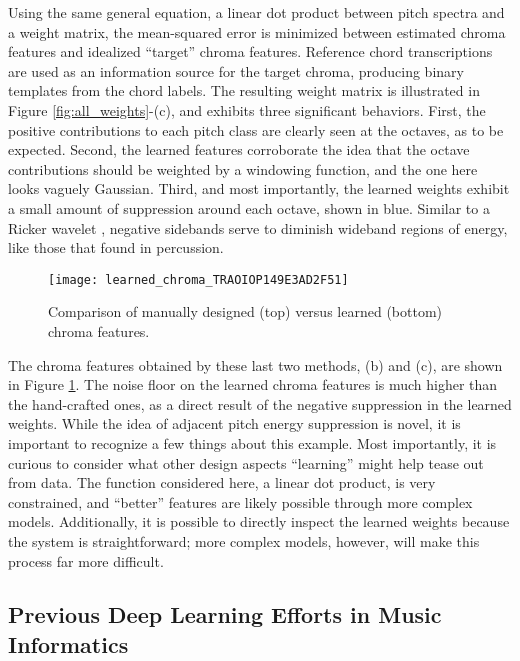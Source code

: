 Using the same general equation, a linear dot product between pitch spectra and a weight matrix, the mean-squared error is minimized between estimated chroma features and idealized ``target'' chroma features.
Reference chord transcriptions are used as an information source for the target chroma, producing binary templates from the chord labels.
The resulting weight matrix is illustrated in Figure \ref{fig:all_weights}-(c), and exhibits three significant behaviors.
First, the positive contributions to each pitch class are clearly seen at the octaves, as to be expected.
Second, the learned features corroborate the idea that the octave contributions should be weighted by a windowing function, and the one here looks vaguely Gaussian.
Third, and most importantly, the learned weights exhibit a small amount of suppression around each octave, shown in blue.
Similar to a Ricker wavelet \cite{Vaidyanathan1993Multirate}, negative sidebands serve to diminish wideband regions of energy, like those that found in percussion.


\begin{figure}
\begin{centering}
\texttt{[image: learned\_chroma\_TRAOIOP149E3AD2F51]}
\caption{Comparison of manually designed (top) versus learned (bottom) chroma features.}
\label{fig:learned_chroma}
\end{centering}
\end{figure}

The chroma features obtained by these last two methods, (b) and (c), are shown in Figure \ref{fig:learned_chroma}.
The noise floor on the learned chroma features is much higher than the hand-crafted ones, as a direct result of the negative suppression in the learned weights.
While the idea of adjacent pitch energy suppression is novel, it is important to recognize a few things about this example.
Most importantly, it is curious to consider what other design aspects ``learning'' might help tease out from data.
The function considered here, a linear dot product, is very constrained, and ``better'' features are likely possible through more complex models.
Additionally, it is possible to directly inspect the learned weights because the system is straightforward; more complex models, however, will make this process far more difficult.


\subsection{Previous Deep Learning Efforts in Music Informatics}

